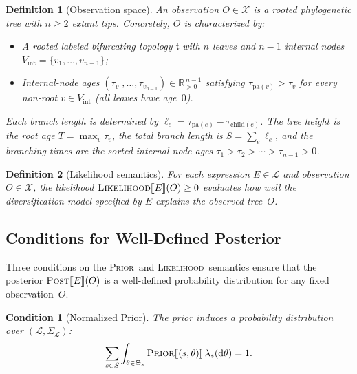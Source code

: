 \documentclass[11pt,a4paper]{article}
\newtheorem{definition}{Definition}[section]
\newtheorem{condition}[condition]{Condition}
\newcommand{\LL}{\mathcal{L}}
\newcommand{\XX}{\mathcal{X}}
\newcommand{\Prior}{\textsc{Prior}}
\newcommand{\Likelihood}{\textsc{Likelihood}}
\newcommand{\Post}{\textsc{Post}}
\newcommand{\sem}[1]{\llbracket #1 \rrbracket}
\begin{document}
\begin{definition}[Observation space]\label{def:obs-space}
An observation $O \in \XX$ is a rooted phylogenetic tree with $n \geq 2$ extant tips.  Concretely, $O$ is
characterized by:
\begin{itemize}[nosep]
  \item A rooted labeled bifurcating topology $\mathfrak{t}$ with $n$
    leaves and $n - 1$ internal nodes
    $V_{\mathrm{int}} = \{v_1, \ldots, v_{n-1}\}$;
  \item Internal-node ages
    $(\tau_{v_1}, \ldots, \tau_{v_{n-1}}) \in \mathbb{R}_{>0}^{\,n-1}$
    satisfying $\tau_{\mathrm{pa}(v)} > \tau_v$ for every non-root
    $v \in V_{\mathrm{int}}$ (all leaves have age~$0$).
\end{itemize}
Each branch length is determined by
$\ell_e = \tau_{\mathrm{pa}(e)} - \tau_{\mathrm{child}(e)}$.  The tree
height is the root age $T = \max_v \tau_v$, the total branch length is
$S = \sum_e \ell_e$, and the branching times are the sorted internal-node
ages $\tau_1 > \tau_2 > \cdots > \tau_{n-1} > 0$.
\end{definition}

\begin{definition}[Likelihood semantics]\label{def:likelihood}
For each expression $E \in \LL$ and observation $O \in \XX$, the
likelihood $\Likelihood\sem{E}(O) \geq 0$ evaluates how well the
diversification model specified by $E$ explains the observed tree~$O$.
\end{definition}

\subsection{Conditions for Well-Defined Posterior}

Three conditions on the \Prior\ and \Likelihood\ semantics ensure that
the posterior $\Post\sem{E}(O)$ is a well-defined probability distribution for any fixed
observation~$O$.

\begin{condition}[Normalized Prior]\label{cond:prior}
The prior induces a probability distribution over $(\LL, \Sigma_\LL)$:
\begin{equation}
  \sum_{s \in S} \int_{\theta \in \Theta_s}
    \Prior\sem{(s,\theta)}\, \lambda_s(\mathrm{d}\theta) = 1.
  \label{eq:normalized-prior}
\end{equation}
\end{condition}
\end{document}
